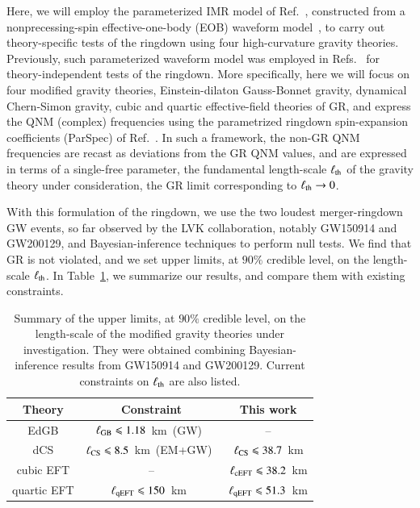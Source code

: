\documentclass[twocolumn,
               prd,
               aps,
               superscriptaddress,
               tightenlines,
               nofootinbib,
               eqsecnum,
               amsfonts,
               amsmath,
               longbibliography]{revtex4-1}
\begin{document}
Here, we will employ the parameterized IMR model of Ref.~\cite{Ghosh:2021mrv}, constructed from a nonprecessing-spin effective-one-body (EOB) waveform model~\cite{Bohe:2016gbl,Cotesta:2018fcv,Mihaylov:2021bpf}, to carry out theory-specific tests of the 
ringdown using four high-curvature gravity theories. Previously, such parameterized 
waveform model was employed in Refs.~\cite{Abbott:2020jks,LIGOScientific:2021sio} for theory-independent tests of the ringdown. More specifically, here we will focus on four modified gravity theories, Einstein-dilaton Gauss-Bonnet gravity, dynamical 
Chern-Simon gravity, cubic and quartic effective-field theories of GR, and 
express the QNM (complex) frequencies using the parametrized ringdown spin-expansion coefficients (ParSpec) 
of Ref.~\cite{Maselli:2019mjd}. In such a framework, the non-GR QNM frequencies are  
recast as deviations from the GR QNM values, and are expressed in terms of a single-free parameter, 
the fundamental length-scale $\ell_{\rm th}$ of the gravity theory under consideration, the GR limit 
corresponding to $\ell_{\rm th} \rightarrow 0$. 

With this formulation of the ringdown, we use the two loudest merger-ringdown GW events, so far 
observed by the LVK collaboration, notably GW150914 and GW200129, and Bayesian-inference techniques to 
perform null tests. We find that GR is not violated, and we set upper limits, at $90\%$ credible level, 
on the length-scale $\ell_{\rm th}$. In Table~\ref{tab:bound_summary}, we summarize our results, and compare 
them with existing constraints.


\begin{table}[th]
\begin{tabular}{c | c c}
\hline \hline
Theory & Constraint & This work \\
\hline
EdGB        & $\ell_{\rm GB} \leqslant 1.18$~km~(GW)~\cite{Lyu:2022gdr} & -- \\
dCS         & $\ell_{\rm CS} \leqslant 8.5$~km~(EM+GW)~\cite{Silva:2020acr}  & $\ell_{\rm CS} \leqslant 38.7$~km \\
cubic EFT   & -- & $\ell_{\rm cEFT} \leqslant 38.2$~km \\
quartic EFT & $\ell_{\rm qEFT} \leqslant 150$~km~\cite{Sennett:2019bpc}  & $\ell_{\rm qEFT} \leqslant 51.3$~km \\
\hline \hline
\end{tabular}
\caption{Summary of the upper limits, at $90\%$ credible level, 
on the length-scale of the modified gravity theories under investigation. 
They were obtained combining Bayesian-inference results from GW150914 and GW200129. 
Current constraints on $\ell_{\rm th}$ are also listed.}
\label{tab:bound_summary}
\end{table}
\end{document}
